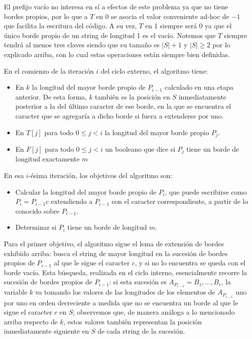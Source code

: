 \medskip

El prefijo vacío no interesa en sí a efectos de este problema ya que no tiene bordes propios, por lo que a $T$ en 0 se asocia el valor conveniente ad-hoc de $-1$ que facilita la escritura del código. A su vez, $T$ en 1 siempre será 0 ya que el único borde propio de un string de longitud 1 es el vacío. Notemos que $T$ siempre tendrá al menos tres claves siendo que su tamaño es $|S|+1$ y $|S| \geq 2$ por lo explicado arriba, con lo cual estas operaciones están siempre bien definidas.

\medskip

En el comienzo de la iteración $i$ del ciclo externo, el algoritmo tiene:
\begin{itemize}
\setlength\itemsep{0em}
\item En $k$ la longitud del mayor borde propio de $P_{i-1}$ calculado en una etapa anterior. De esta forma, $k$ también es la posición en $S$ inmediatamente posterior a la del último caracter de ese borde, en la que se encuentra el caracter que se agregaría a dicho borde si fuera a extenderse por uno.
\item En $T[j]$ para todo $0 \leq j < i$ la longitud del mayor borde propio $P_j$.
\item En $F[j]$ para todo $0 \leq j < i$ un booleano que dice si $P_j$ tiene un borde de longitud exactamente $m$
\end{itemize}

En esa $i$-ésima iteración, los objetivos del algoritmo son:
\begin{itemize}
\setlength\itemsep{0em}
\item Calcular la longitud del mayor borde propio de $P_i$, que puede escribirse como $P_i = P_{i-1}c$ extendiendo a $P_{i-1}$ con el caracter correspondiente, a partir de lo conocido sobre $P_{i-1}$.
\item Determinar si $P_i$ tiene un borde de longitud $m$.
\end{itemize}

Para el primer objetivo, el algoritmo sigue el lema de extensión de bordes exhibido arriba: busca el string de mayor longitud en la sucesión de bordes propios de $P_{i-1}$ al que le sigue el caracter $c$, y si no lo encuentra se queda con el borde vacío. Esta búsqueda, realizada en el ciclo interno, esencialmente recorre la sucesión de bordes propios de $P_{i-1}$: si esta sucesión es $A_{P_{i-1}} = B_1, \dots, B_r$, la variable $k$ va tomando los valores de las longitudes de los elementos de $A_{P_{i-1}}$ uno por uno en orden decreciente a medida que no se encuentra un borde al que le sigue el caracter $c$ en $S$; observemos que, de manera análoga a lo mencionado arriba respecto de $k$, estos valores también representan la posición inmediatamente siguiente en $S$ de cada string de la sucesión.

